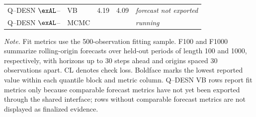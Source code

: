 \begin{table}[H]
\begin{tabular}{@{}llrrrrrr@{}}
Q--DESN \(\exAL\)--\RHS{} & VB & 4.19 & 4.09 & \multicolumn{4}{c}{\emph{forecast not exported}} \\
Q--DESN \(\exAL\)--\RHS{} & MCMC & \multicolumn{6}{c}{\emph{running}} \\
\bottomrule
\end{tabular}
\par\vspace{0.35em}
\begin{minipage}{0.97\textwidth}\footnotesize
\emph{Note.} Fit metrics use the 500-observation fitting sample. F100 and F1000 summarize rolling-origin forecasts over held-out periods of length 100 and 1000, respectively, with horizons up to 30 steps ahead and origins spaced 30 observations apart. CL denotes check loss. Boldface marks the lowest reported value within each quantile block and metric column. Q--DESN VB rows report fit metrics only because comparable forecast metrics have not yet been exported through the shared interface; rows without comparable forecast metrics are not displayed as finalized evidence.
\end{minipage}
\end{table}

